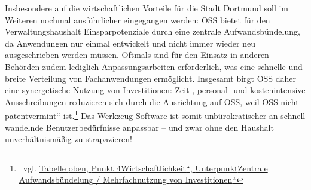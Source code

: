 \documentclass[a4paper]{article}
\newcommand\textstyleInternetlink[1]{\foreignlanguage{english}{\textcolor[rgb]{0.0,0.0,0.5019608}{#1}}}
\begin{document}
{
Insbesondere auf die wirtschaftlichen Vorteile f\"ur die Stadt Dortmund
soll im Weiteren nochmal ausf\"uhrlicher eingegangen werden: OSS bietet
f\"ur den Verwaltungshaushalt Einsparpotenziale durch eine zentrale
Aufwandsb\"undelung, da Anwendungen nur einmal entwickelt und nicht
immer wieder neu ausgeschrieben werden m\"ussen. Oftmals sind f\"ur den
Einsatz in anderen Beh\"orden zudem lediglich Anpassungsarbeiten
erforderlich, was eine schnelle und breite Verteilung von
Fachanwendungen erm\"oglicht. Insgesamt birgt OSS daher eine
synergetische Nutzung von Investitionen: Zeit-, personal- und
kostenintensive Ausschreibungen reduzieren sich durch die Ausrichtung
auf OSS, weil OSS nicht {\quotedblbase}patentvermint{\textquotedblleft}
ist.\footnote{\ vgl.
\hyperlink{ZentraleAufwandsbndelung}{\textstyleInternetlink{Tabelle}}\hyperlink{ZentraleAufwandsbndelung}{\textstyleInternetlink{
}}\hyperlink{ZentraleAufwandsbndelung}{\textstyleInternetlink{oben,}}\hyperlink{ZentraleAufwandsbndelung}{\textstyleInternetlink{
}}\hyperlink{ZentraleAufwandsbndelung}{\textstyleInternetlink{Punkt}}\hyperlink{ZentraleAufwandsbndelung}{\textstyleInternetlink{
}}\hyperlink{ZentraleAufwandsbndelung}{\textstyleInternetlink{4}}\hyperlink{ZentraleAufwandsbndelung}{\textstyleInternetlink{
{\quotedblbase}}}\hyperlink{ZentraleAufwandsbndelung}{\textstyleInternetlink{Wirtschaftlichkeit}}\hyperlink{ZentraleAufwandsbndelung}{\textstyleInternetlink{{\textquotedblleft}}}\hyperlink{ZentraleAufwandsbndelung}{\textstyleInternetlink{,}}\hyperlink{ZentraleAufwandsbndelung}{\textstyleInternetlink{
}}\hyperlink{ZentraleAufwandsbndelung}{\textstyleInternetlink{Unterpunkt}}\hyperlink{ZentraleAufwandsbndelung}{\textstyleInternetlink{
{\quotedblbase}}}\hyperlink{ZentraleAufwandsbndelung}{\textstyleInternetlink{Zentrale}}\hyperlink{ZentraleAufwandsbndelung}{\textstyleInternetlink{
}}\hyperlink{ZentraleAufwandsbndelung}{\textstyleInternetlink{Aufwandsb\"undelung}}\hyperlink{ZentraleAufwandsbndelung}{\textstyleInternetlink{
}}\hyperlink{ZentraleAufwandsbndelung}{\textstyleInternetlink{/}}\hyperlink{ZentraleAufwandsbndelung}{\textstyleInternetlink{
}}\hyperlink{ZentraleAufwandsbndelung}{\textstyleInternetlink{Mehrfachnutzung}}\hyperlink{ZentraleAufwandsbndelung}{\textstyleInternetlink{
}}\hyperlink{ZentraleAufwandsbndelung}{\textstyleInternetlink{von}}\hyperlink{ZentraleAufwandsbndelung}{\textstyleInternetlink{
}}\hyperlink{ZentraleAufwandsbndelung}{\textstyleInternetlink{Investitionen}}\hyperlink{ZentraleAufwandsbndelung}{\textstyleInternetlink{{\textquotedblleft}}}}
Das Werkzeug Software ist somit unb\"urokratischer an schnell wandelnde
Benutzerbed\"urfnisse anpassbar -- und zwar ohne den Haushalt
unverh\"altnism\"a{\ss}ig zu strapazieren!}
\end{document}
